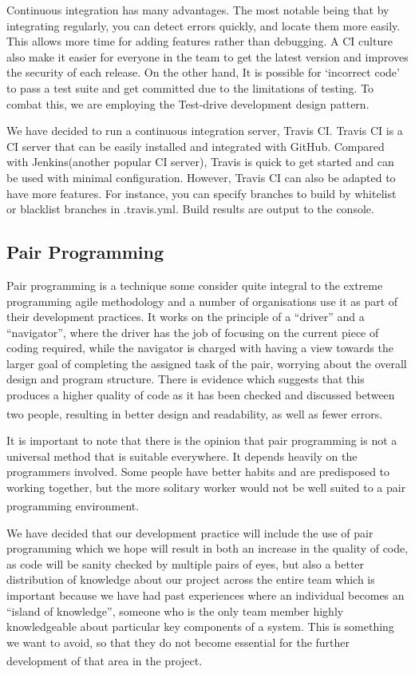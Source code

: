 \documentclass[10pt, a4paper]{article}
\begin{document}
Continuous integration has many advantages. The most notable being that by integrating regularly, you can detect errors quickly, and locate them more easily. This allows more time for adding features rather than debugging. A CI culture also make it easier for everyone in the team to get the latest version and improves the security of each release. On the other hand, It is possible for ‘incorrect code’ to pass a test suite and get committed  due to the limitations of testing. To combat this, we are employing the Test-drive development design pattern. 

We have decided to run a continuous integration server, Travis CI. Travis CI is a CI server that can be easily installed and integrated with GitHub.  Compared with Jenkins(another popular CI server), Travis is quick to get started and can be used with minimal configuration. However, Travis CI can also be adapted to have more features. For instance, you can specify branches to build by whitelist or blacklist branches in .travis.yml. Build results are output to the console.

\subsection{Pair Programming}

Pair programming is a technique some consider quite integral to the extreme programming agile methodology and a number of organisations use it as part of their development practices. It works on the principle of a “driver” and a “navigator”, where the driver has the job of focusing on the current piece of coding required, while the navigator is charged with having a view towards the larger goal of completing the assigned task of the pair, worrying about the overall design and program structure. There is evidence which suggests that this produces a higher quality of code as it has been checked and discussed between two people, resulting in better design and readability, as well as fewer errors\textsuperscript{\cite{pairprog1a,pairprog1b,pairprog1c,pairprog1d}}.

It is important to note that there is the opinion that pair programming is not a universal method that is suitable everywhere. It depends heavily on the programmers involved. Some people have better habits and are predisposed to working together, but the more solitary worker would not be well suited to a pair programming environment\textsuperscript{\cite{partswap}}.

We have decided that our development practice will include the use of pair programming  which we hope will result in both an increase in the quality of code, as code will be sanity checked by multiple pairs of eyes, but also a better distribution of knowledge about our project across the entire team which is important because we have had past experiences where an individual becomes an “island of knowledge”, someone who is the only team member highly knowledgeable about particular key components of a system. This is something we want to avoid, so that they do not become essential for the further development of that area in the project\textsuperscript{\cite{pairprog2}}.
\end{document}
